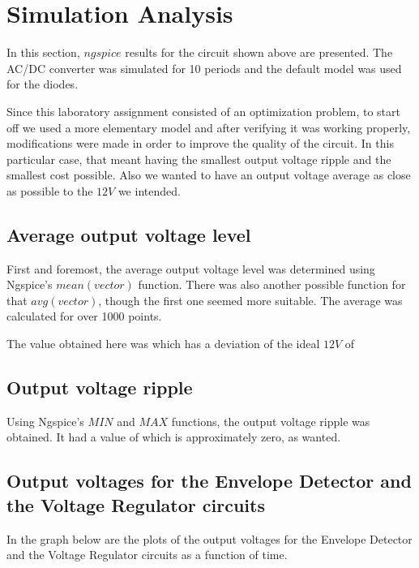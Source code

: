 \section{Simulation Analysis}
\label{sec:simulation}

In this section, $ngspice$ results for the circuit shown above are presented. The AC/DC converter was simulated for 10 periods and the default model was used for the diodes.

Since this laboratory assignment consisted of an optimization problem, to start off we used a more elementary model and after verifying it was working properly, modifications were made in order to improve the quality of the circuit. In this particular case, that meant having the smallest output voltage ripple and the smallest cost possible. Also we wanted to have an output voltage average as close as possible to the $12 V$ we intended.


\subsection{Average output voltage level}
First and foremost, the average output voltage level was determined using Ngspice's $mean(vector)$ function. There was also another possible function for that $avg(vector)$, though the first one seemed more suitable. The average was calculated for over 1000 points.

The value obtained here was %
which has a deviation of the ideal $12 V$ of %




\subsection{Output voltage ripple}
Using Ngspice's $MIN$ and $MAX$ functions, the output voltage ripple was obtained. It had a value of %
which is approximately zero, as wanted.






\subsection{Output voltages for the Envelope Detector and the Voltage Regulator circuits}
In the graph below are the plots of the output voltages for the Envelope Detector and the Voltage Regulator circuits as a function of time.


